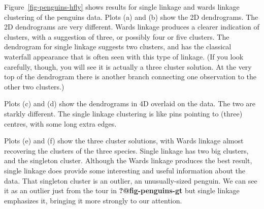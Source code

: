 \documentclass[
  letterpaper,
]{book}
\begin{document}
Figure~\ref{fig-penguins-hfly} shows results for single linkage and
wards linkage clustering of the penguins data. Plots (a) and (b) show
the 2D dendrograms. The 2D dendrograms are very different. Wards linkage
produces a clearer indication of clusters, with a suggestion of three,
or possibly four or five clusters. The dendrogram for single linkage
suggests two clusters, and has the classical waterfall appearance that
is often seen with this type of linkage. (If you look carefully, though,
you will see it is actually a three cluster solution. At the very top of
the dendrogram there is another branch connecting one observation to the
other two clusters.)

Plots (c) and (d) show the dendrograms in 4D overlaid on the data. The
two are starkly different. The single linkage clustering is like pins
pointing to (three) centres, with some long extra edges.

Plots (e) and (f) show the three cluster solutions, with Wards linkage
almost recovering the clusters of the three species. Single linkage has
two big clusters, and the singleton cluster. Although the Wards linkage
produces the best result, single linkage does provide some interesting
and useful information about the data. That singleton cluster is an
outlier, an unusually-sized penguin. We can see it as an outlier just
from the tour in \textbf{?@fig-penguins-gt} but single linkage
emphasizes it, bringing it more strongly to our attention.
\end{document}
